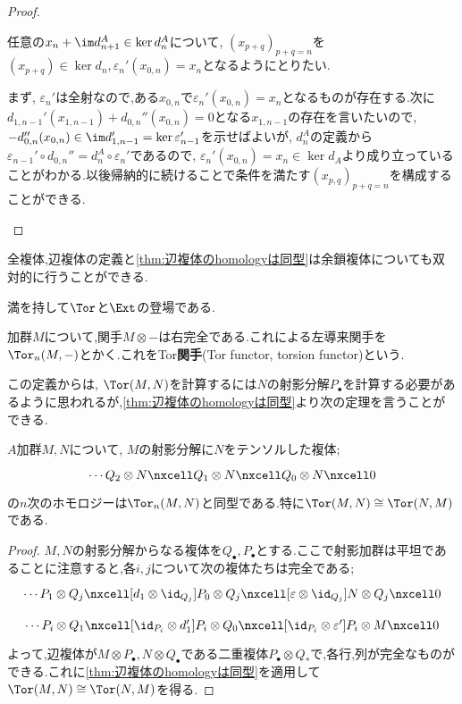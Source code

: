 \begin{proof}
\begin{step}
		任意の$x_n+\im d_{n+1}^A\in\ker d_n^A$について, $(x_{p+q})_{p+q=n}$を$(x_{p+q})\in\ker d_n,\varepsilon_n'(x_{0,n})=x_n$となるようにとりたい.
		
		まず, $\varepsilon_n'$は全射なので,ある$x_{0,n}$で$\varepsilon_n'(x_{0,n})=x_n$となるものが存在する.次に$d_{1,n-1}'(x_{1,n-1})+d_{0,n}''(x_{0,n})=0$となる$x_{1,n-1}$の存在を言いたいので, $-d_{0,n}''(x_{0,n})\in\im d_{1,n-1}'=\ker\varepsilon_{n-1}'$を示せばよいが, $d_n^A$の定義から$\varepsilon_{n-1}'\circ d_{0,n}''=d_n^A\circ\varepsilon_n'$であるので, $\varepsilon_n'(x_{0,n})=x_n\in\ker d_A$より成り立っていることがわかる.以後帰納的に続けることで条件を満たす$(x_{p,q})_{p+q=n}$を構成することができる.
		
	\end{step}
\end{proof}

全複体,辺複体の定義と\ref{thm:辺複体のhomologyは同型}は余鎖複体についても双対的に行うことができる.

満を持して$\Tor$と$\Ext$の登場である.
\begin{defi}[$\Tor$関手]
	加群$M$について,関手$M\otimes -$は右完全である.これによる左導来関手を$\Tor_n(M,-)$とかく.これをTor\textbf{関手}(Tor functor, torsion functor)という. 
\end{defi}

この定義からは, $\Tor(M,N)$を計算するには$N$の射影分解$P_\bullet$を計算する必要があるように思われるが,\ref{thm:辺複体のhomologyは同型}より次の定理を言うことができる.

\begin{thm}
	$A$加群$M,N$について, $M$の射影分解に$N$をテンソルした複体;
	\[\begin{tikzcd}
		\cdots Q_2\otimes N\nxcell Q_1\otimes N\nxcell Q_0\otimes N\nxcell0
	\end{tikzcd}\]
	の$n$次のホモロジーは$\Tor_n(M,N)$と同型である.特に$\Tor(M,N)\cong\Tor(N,M)$である.
\end{thm}

\begin{proof}
	$M,N$の射影分解からなる複体を$Q_\bullet,P_\bullet$とする.ここで射影加群は平坦であることに注意すると,各$i,j$について次の複体たちは完全である;
	\[\begin{tikzcd}
		\cdots P_1\otimes Q_j\nxcell[d_1\otimes\id_{Q_j}] P_0\otimes Q_j\nxcell[\varepsilon\otimes\id_{Q_j}]N\otimes Q_j\nxcell0
	\end{tikzcd}\]
	\[\begin{tikzcd}
		\cdots P_i\otimes Q_1\nxcell[\id_{P_i}\otimes d_1'] P_i\otimes Q_0\nxcell[\id_{P_i}\otimes\varepsilon']P_i\otimes M\nxcell0
	\end{tikzcd}\]
	よって,辺複体が$M\otimes P_\bullet,N\otimes Q_\bullet$である二重複体$P_\bullet\otimes Q_\ast$で,各行,列が完全なものができる.これに\ref{thm:辺複体のhomologyは同型}を適用して$\Tor(M,N)\cong\Tor(N,M)$を得る.
\end{proof}


